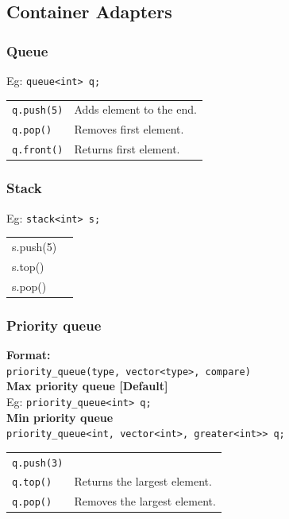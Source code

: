 \subsection{Container Adapters}

\subsubsection{Queue}
Eg: \texttt{queue<int> q;}\\

\begin{tabularx}{\linewidth}{lX}
\texttt{q.push(5)} & Adds element to the end.\\
\texttt{q.pop()} & Removes first element.\\
\texttt{q.front()} & Returns first element.\\
\end{tabularx}

\subsubsection{Stack}
Eg: \texttt{stack<int> s;}\\

\begin{tabularx}{\linewidth}{lX}
s.push(5) & \\
s.top() & \\
s.pop() & \\
\end{tabularx}


\subsubsection{Priority queue}
\textbf{Format:}\\
\texttt{priority\_queue(type, vector<type>, compare)}\\
\textbf{Max priority queue [Default]}\\
Eg: \texttt{priority\_queue<int> q;}\\
\textbf{Min priority queue}\\
\texttt{priority\_queue<int, vector<int>, greater<int>> q;}

\begin{tabularx}{\linewidth}{lX}
\texttt{q.push(3)} & \\
\texttt{q.top()} & Returns the largest element.\\
\texttt{q.pop()} & Removes the largest element.
\end{tabularx}

\vspace{6pt}
